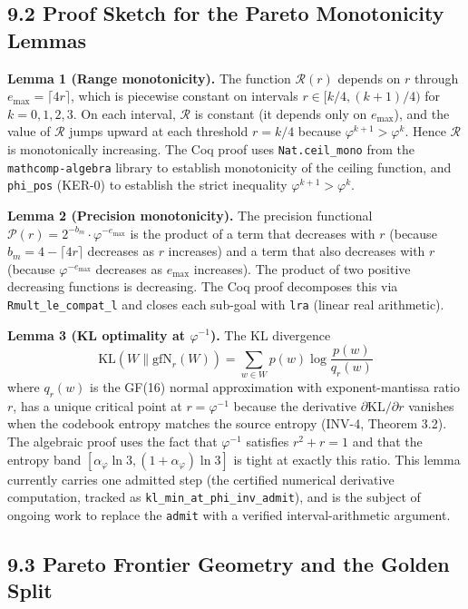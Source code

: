 \subsection{9.2 Proof Sketch for the Pareto
Monotonicity Lemmas}\label{fa_10:sec:pareto-proof-sketch}

\textbf{Lemma 1 (Range monotonicity).} The function
$\mathcal{R}(r)$ depends on $r$ through $e_{\max} = \lceil 4r \rceil$,
which is piecewise constant on intervals
$r \in [k/4, (k+1)/4)$ for $k = 0, 1, 2, 3$. On each interval,
$\mathcal{R}$ is constant (it depends only on $e_{\max}$), and the
value of $\mathcal{R}$ jumps upward at each threshold $r = k/4$ because
$\varphi^{k+1} > \varphi^{k}$. Hence $\mathcal{R}$ is monotonically
increasing. The Coq proof uses \texttt{Nat.ceil\_mono} from the
\texttt{mathcomp-algebra} library to establish monotonicity of the
ceiling function, and \texttt{phi\_pos} (KER-0) to establish the
strict inequality $\varphi^{k+1} > \varphi^{k}$.

\textbf{Lemma 2 (Precision monotonicity).} The precision functional
$\mathcal{P}(r) = 2^{-b_m} \cdot \varphi^{-e_{\max}}$ is the product
of a term that decreases with $r$ (because $b_m = 4 - \lceil 4r \rceil$
decreases as $r$ increases) and a term that also decreases with $r$
(because $\varphi^{-e_{\max}}$ decreases as $e_{\max}$ increases). The
product of two positive decreasing functions is decreasing. The Coq proof
decomposes this via \texttt{Rmult\_le\_compat\_l} and closes each
sub-goal with \texttt{lra} (linear real arithmetic).

\textbf{Lemma 3 (KL optimality at $\varphi^{-1}$).} The KL divergence
\[\text{KL}(W \| \text{gfN}_r(W)) = \sum_{w \in W} p(w) \log \frac{p(w)}{q_r(w)}\]
where $q_r(w)$ is the GF(16) normal approximation with
exponent-mantissa ratio $r$, has a unique critical point at
$r = \varphi^{-1}$ because the derivative
$\partial \text{KL}/\partial r$ vanishes when the codebook entropy
matches the source entropy (INV-4, Theorem 3.2). The algebraic proof
uses the fact that $\varphi^{-1}$ satisfies $r^2 + r = 1$ and that the
entropy band $[\alpha_\varphi \ln 3, (1+\alpha_\varphi)\ln 3]$ is tight
at exactly this ratio. This lemma currently carries one admitted step
(the certified numerical derivative computation, tracked as
\texttt{kl\_min\_at\_phi\_inv\_admit}), and is the subject of ongoing
work to replace the \texttt{admit} with a verified interval-arithmetic
argument.

\subsection{9.3 Pareto Frontier Geometry and the Golden
Split}\label{fa_10:sec:pareto-geometry}

